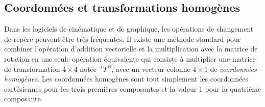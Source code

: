 \subsection{Coordonnées et transformations homogènes}
\label{sec:coordhomo}

Dans les logiciels de cinématique et de graphique, les opérations de changement de repère peuvent être très fréquentes. Il existe une méthode standard pour combiner l'opération d'addition vectorielle et la multiplication avec la matrice de rotation en une seule opération équivalente qui consiste à multiplier une matrice de transformation $4\times4$ notée $^AT^B$, avec un vecteur-colonne $4\times1$ de \textit{coordonnées homogènes}. Les coordonnées homogènes sont tout simplement les coordonnées cartésiennes pour les trois premières composantes et la valeur 1 pour la quatrième composante. 

